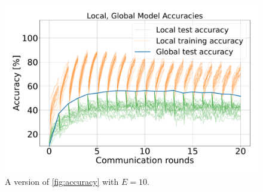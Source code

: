 \documentclass{article}
\begin{document}
\begin{figure}[htb!]
    \centering
        \includegraphics[width=\linewidth]{imgs/accuracyE10.pdf}
    \caption{
        A version of \ref{fig:accuracy} with $E=10$.
    }
    \label{fig:accuracy2}
\end{figure}\noindent
\end{document}
